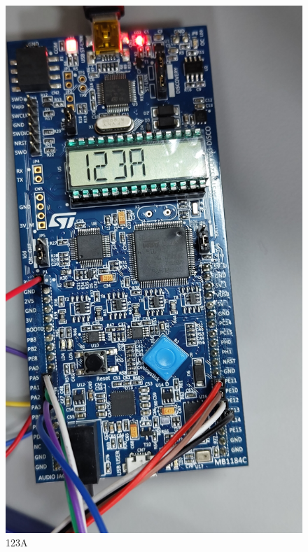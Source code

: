 \documentclass[12pt]{article}
\begin{document}
\begin{figure}[h!]
\begin{minipage}{0.45\textwidth}
    \includegraphics[width=\textwidth]{123A.jpg}
    \caption{123A}
    \end{minipage}
\end{figure}
\end{document}
